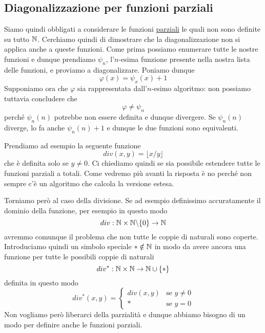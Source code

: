 \subsection{Diagonalizzazione per funzioni parziali}
Siamo quindi obbligati a considerare le funzioni
\hyperref[def: funzione parziale]{parziali} le quali non sono
definite su tutto $\mathbb{N}$. Cerchiamo quindi di dimostrare che
la diagonalizzazione non si applica anche a queste funzioni.
Come prima possiamo enumerare tutte le nostre funzioni e
dunque prendiamo $\psi_n$, l'$n$-esima funzione presente nella
nostra lista delle funzioni, e proviamo a diagonalizzare.
Poniamo dunque
\[ \varphi (x) = \psi_x (x) + 1 \]
Supponiamo ora che $\varphi$ sia rappresentata dall'$n$-esimo
algoritmo: non possiamo tuttavia concludere che
\[ \varphi \neq \psi_n \]
perché $\psi_n(n)$ potrebbe non essere definita e dunque
divergere. Se $\psi_n(n)$ diverge, lo fa anche $\psi_n(n)+1$
e dunque le due funzioni sono equivalenti.

Prendiamo ad esempio la seguente funzione
\[ div(x,y) = \lfloor x / y \rfloor \]
che è definita solo se $y \neq 0$. Ci chiediamo quindi se sia
possibile estendere tutte le funzioni parziali a totali. Come
vedremo più avanti la risposta è no perché non sempre c'è un
algoritmo che calcola la versione estesa.

Torniamo però al caso della divisione. Se ad esempio definissimo
accuratamente il dominio della funzione, per esempio in questo
modo
\[ div : \mathbb{N} \times \mathbb{N} \backslash \{ 0 \} \to \mathbb{N} \]
avremmo comunque il problema che non tutte le coppie di naturali
sono coperte. Introduciamo quindi un simbolo speciale
$* \notin \mathbb{N}$ in modo da avere ancora una funzione per tutte le
possibili coppie di naturali
\[ div^* : \mathbb{N} \times \mathbb{N} \to \mathbb{N} \cup \{ * \} \]
definita in questo modo
\[
	div^* (x, y) = \begin{cases}
		div(x, y) & \text{se } y \neq 0 \\
		*         & \text{se } y = 0
	\end{cases}
\]
Non vogliamo però liberarci della parzialità e dunque abbiamo
bisogno di un modo per definire anche le funzioni parziali.


